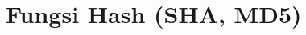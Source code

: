 \documentclass[../buku_kriptografi.tex]{subfiles}
\begin{document}
\ifdefined\InMainDocument\else\setcounter{chapter}{8}\fi

\chapter{Fungsi Hash (SHA, MD5)}






\ifdefined\InMainDocument\else


\fi
\end{document}
